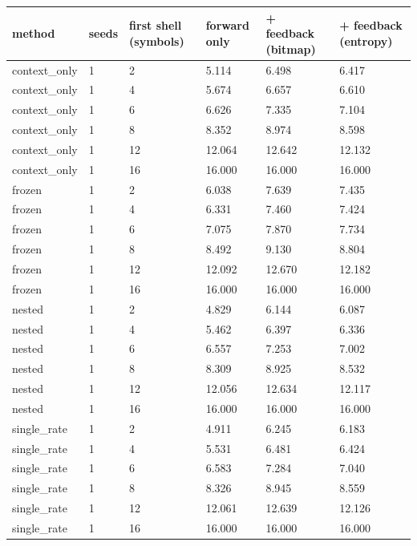 \begin{tabular}{llllll}
\hline
method & seeds & first shell (symbols) & forward only & + feedback (bitmap) & + feedback (entropy) \\
\hline
context\_only & 1 & 2 & 5.114 & 6.498 & 6.417 \\
context\_only & 1 & 4 & 5.674 & 6.657 & 6.610 \\
context\_only & 1 & 6 & 6.626 & 7.335 & 7.104 \\
context\_only & 1 & 8 & 8.352 & 8.974 & 8.598 \\
context\_only & 1 & 12 & 12.064 & 12.642 & 12.132 \\
context\_only & 1 & 16 & 16.000 & 16.000 & 16.000 \\
frozen & 1 & 2 & 6.038 & 7.639 & 7.435 \\
frozen & 1 & 4 & 6.331 & 7.460 & 7.424 \\
frozen & 1 & 6 & 7.075 & 7.870 & 7.734 \\
frozen & 1 & 8 & 8.492 & 9.130 & 8.804 \\
frozen & 1 & 12 & 12.092 & 12.670 & 12.182 \\
frozen & 1 & 16 & 16.000 & 16.000 & 16.000 \\
nested & 1 & 2 & 4.829 & 6.144 & 6.087 \\
nested & 1 & 4 & 5.462 & 6.397 & 6.336 \\
nested & 1 & 6 & 6.557 & 7.253 & 7.002 \\
nested & 1 & 8 & 8.309 & 8.925 & 8.532 \\
nested & 1 & 12 & 12.056 & 12.634 & 12.117 \\
nested & 1 & 16 & 16.000 & 16.000 & 16.000 \\
single\_rate & 1 & 2 & 4.911 & 6.245 & 6.183 \\
single\_rate & 1 & 4 & 5.531 & 6.481 & 6.424 \\
single\_rate & 1 & 6 & 6.583 & 7.284 & 7.040 \\
single\_rate & 1 & 8 & 8.326 & 8.945 & 8.559 \\
single\_rate & 1 & 12 & 12.061 & 12.639 & 12.126 \\
single\_rate & 1 & 16 & 16.000 & 16.000 & 16.000 \\
\hline
\end{tabular}
